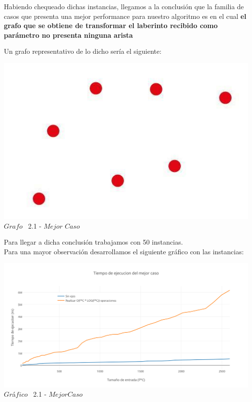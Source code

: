 Habiendo chequeado dichas instancias, llegamos a la conclusi\'on que la familia de casos que presenta una mejor performance para nuestro algoritmo
es en el cual \textbf{el grafo que se obtiene de transformar el laberinto recibido como par\'ametro no presenta ninguna arista}

Un grafo representativo de lo dicho ser\'ia el siguiente:

\vspace*{0.3cm} \vspace*{0.3cm}
  \begin{center}
 \includegraphics[scale=0.5]{./EJ2/grafoSinEjes.jpeg}
 \\{$Grafo$ \ 2.1 - $Mejor$ $Caso$}
  \end{center}
  \vspace*{0.3cm}
  
Para llegar a dicha conclusi\'on trabajamos con 50 instancias.\\

Para una mayor observaci\'on desarrollamos el siguiente gr\'afico con las instancias:\\

\vspace*{0.3cm} \vspace*{0.3cm}
  \begin{center}
 \includegraphics[scale=0.65]{./EJ2/mejorcaso.png}
 {$Gr$\'a$fico$ \ 2.1 - $Mejor Caso$}
  \end{center}
  \vspace*{0.3cm}
  
